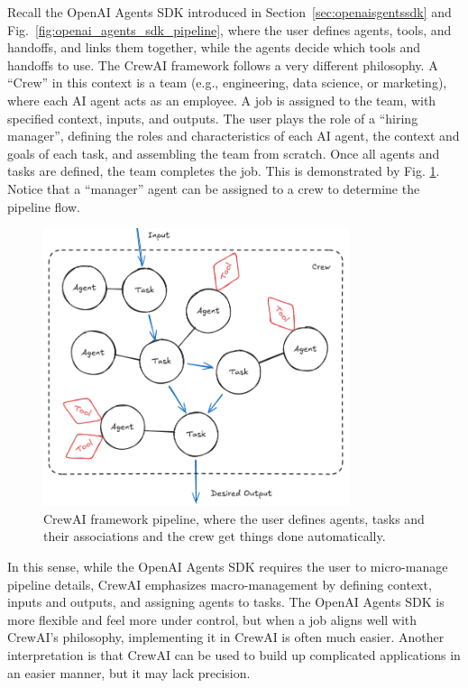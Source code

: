 Recall the OpenAI Agents SDK introduced in Section~\ref{sec:openaisgentssdk} and Fig.~\ref{fig:openai_agents_sdk_pipeline}, where the user defines agents, tools, and handoffs, and links them together, while the agents decide which tools and handoffs to use. The CrewAI framework follows a very different philosophy. A ``Crew'' in this context is a team (e.g., engineering, data science, or marketing), where each AI agent acts as an employee. A job is assigned to the team, with specified context, inputs, and outputs. The user plays the role of a ``hiring manager'', defining the roles and characteristics of each AI agent, the context and goals of each task, and assembling the team from scratch. Once all agents and tasks are defined, the team completes the job. This is demonstrated by Fig. \ref{fig:crewai_pipeline}. Notice that a ``manager'' agent can be assigned to a crew to determine the pipeline flow.

\begin{figure}[!htb]
	\centering
	\includegraphics[width=0.8\textwidth]{./chapters/part-7/figures/crewai.png}
	\caption{CrewAI framework pipeline, where the user defines agents, tasks and their associations and the crew get things done automatically.}
	\label{fig:crewai_pipeline}
\end{figure}

In this sense, while the OpenAI Agents SDK requires the user to micro-manage pipeline details, CrewAI emphasizes macro-management by defining context, inputs and outputs, and assigning agents to tasks. The OpenAI Agents SDK is more flexible and feel more under control, but when a job aligns well with CrewAI's philosophy, implementing it in CrewAI is often much easier. Another interpretation is that CrewAI can be used to build up complicated applications in an easier manner, but it may lack precision.

